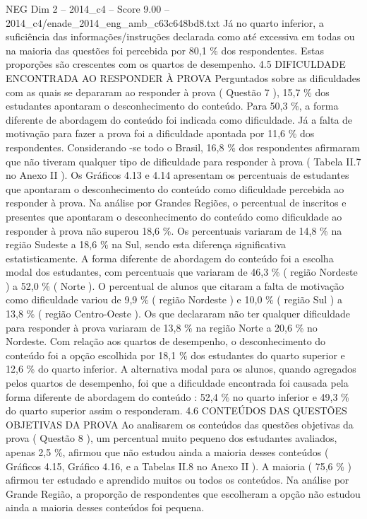 \begin{textsample}{NEG Dim 2 – 2014\_c4 – Score 9.00 – 2014\_c4/enade\_2014\_eng\_amb\_c63c648bd8.txt}
Já no quarto inferior, a suficiência das informações/instruções declarada como até excessiva em todas ou na maioria das questões foi percebida por 80,1 \% dos respondentes.
Estas proporções são crescentes com os quartos de desempenho. 4.5 DIFICULDADE ENCONTRADA AO RESPONDER À PROVA Perguntados sobre as dificuldades com as quais se depararam ao responder à prova ( Questão 7 ), 15,7 \% dos estudantes apontaram o desconhecimento do conteúdo.
Para 50,3 \%, a forma diferente de abordagem do conteúdo foi indicada como dificuldade.
Já a falta de motivação para fazer a prova foi a dificuldade apontada por 11,6 \% dos respondentes.
Considerando -se todo o Brasil, 16,8 \% dos respondentes afirmaram que não tiveram qualquer tipo de dificuldade para responder à prova ( Tabela II.7 no Anexo II ).
Os Gráficos 4.13 e 4.14 apresentam os percentuais de estudantes que apontaram o desconhecimento do conteúdo como dificuldade percebida ao responder à prova.
Na análise por Grandes Regiões, o percentual de inscritos e presentes que apontaram o desconhecimento do conteúdo como dificuldade ao responder à prova não superou 18,6 \%.
Os percentuais variaram de 14,8 \% na região Sudeste a 18,6 \% na Sul, sendo esta diferença significativa estatisticamente.
A forma diferente de abordagem do conteúdo foi a escolha modal dos estudantes, com percentuais que variaram de 46,3 \% ( região Nordeste ) a 52,0 \% ( Norte ).
O percentual de alunos que citaram a falta de motivação como dificuldade variou de 9,9 \% ( região Nordeste ) e 10,0 \% ( região Sul ) a 13,8 \% ( região Centro-Oeste ).
Os que declararam não ter qualquer dificuldade para responder à prova variaram de 13,8 \% na região Norte a 20,6 \% no Nordeste.
Com relação aos quartos de desempenho, o desconhecimento do conteúdo foi a opção escolhida por 18,1 \% dos estudantes do quarto superior e 12,6 \% do quarto inferior.
A alternativa modal para os alunos, quando agregados pelos quartos de desempenho, foi que a dificuldade encontrada foi causada pela forma diferente de abordagem do conteúdo : 52,4 \% no quarto inferior e 49,3 \% do quarto superior assim o responderam. 4.6 CONTEÚDOS DAS QUESTÕES OBJETIVAS DA PROVA Ao analisarem os conteúdos das questões objetivas da prova ( Questão 8 ), um percentual muito pequeno dos estudantes avaliados, apenas 2,5 \%, afirmou que não estudou ainda a maioria desses conteúdos ( Gráficos 4.15, Gráfico 4.16, e a Tabelas II.8 no Anexo II ).
A maioria ( 75,6 \% ) afirmou ter estudado e aprendido muitos ou todos os conteúdos.
Na análise por Grande Região, a proporção de respondentes que escolheram a opção não estudou ainda a maioria desses conteúdos foi pequena.

\end{textsample}
